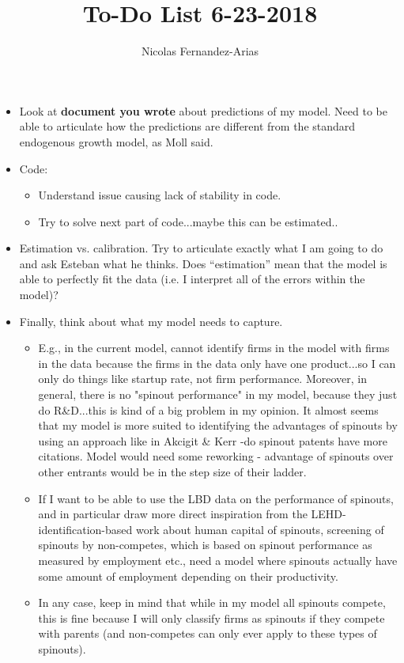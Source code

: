 \documentclass[12pt,english]{article}
\date{}
\theoremstyle{remark}
\begin{document}
	
\title{To-Do List 6-23-2018}
\author{Nicolas Fernandez-Arias}
\maketitle

\begin{itemize}
	\item Look at \textbf{document you wrote} about predictions of my model. Need to be able to articulate how the predictions are different from the standard endogenous growth model, as Moll said.
	\item Code:
	\begin{itemize}
		\item Understand issue causing lack of stability in code. 
		\item Try to solve next part of code...maybe this can be estimated..
	\end{itemize}
	\item Estimation vs. calibration. Try to articulate exactly what I am going to do and ask Esteban what he thinks. Does ``estimation'' mean that the model is able to perfectly fit the data (i.e. I interpret all of the errors within the model)?
	\item Finally, think about what my model needs to capture. 
	\begin{itemize}
		\item E.g., in the current model, cannot identify firms in the model with firms in the data because the firms in the data only have one product...so I can only do things like startup rate, not firm performance. Moreover, in general, there is no "spinout performance" in my model, because they just do R\&D...this is kind of a big problem in my opinion. It almost seems that my model is more suited to identifying the advantages of spinouts by using an approach like in Akcigit \& Kerr -do spinout patents have more citations. Model would need some reworking - advantage of spinouts over other entrants would be in the step size of their ladder.
		\item If I want to be able to use the LBD data on the performance of spinouts, and in particular draw more direct inspiration from the LEHD-identification-based work about human capital of spinouts, screening of spinouts by non-competes, which is based on spinout performance as measured by employment etc., need a model where spinouts actually have some amount of employment depending on their productivity. 
		\item In any case, keep in mind that while in my model all spinouts compete, this is fine because I will only classify firms as spinouts if they compete with parents (and non-competes can only ever apply to these types of spinouts).
	\end{itemize} 
	
\end{itemize}
\end{document}
